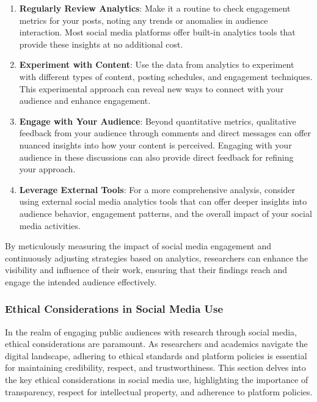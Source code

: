 \documentclass[
]{book}
\begin{document}
\begin{enumerate}
\def\labelenumi{\arabic{enumi}.}
\item
  \textbf{Regularly Review Analytics}: Make it a routine to check engagement metrics for your posts, noting any trends or anomalies in audience interaction. Most social media platforms offer built-in analytics tools that provide these insights at no additional cost.
\item
  \textbf{Experiment with Content}: Use the data from analytics to experiment with different types of content, posting schedules, and engagement techniques. This experimental approach can reveal new ways to connect with your audience and enhance engagement.
\item
  \textbf{Engage with Your Audience}: Beyond quantitative metrics, qualitative feedback from your audience through comments and direct messages can offer nuanced insights into how your content is perceived. Engaging with your audience in these discussions can also provide direct feedback for refining your approach.
\item
  \textbf{Leverage External Tools}: For a more comprehensive analysis, consider using external social media analytics tools that can offer deeper insights into audience behavior, engagement patterns, and the overall impact of your social media activities.
\end{enumerate}

By meticulously measuring the impact of social media engagement and continuously adjusting strategies based on analytics, researchers can enhance the visibility and influence of their work, ensuring that their findings reach and engage the intended audience effectively.

\hypertarget{ethical-considerations-in-social-media-use}{%
\subsubsection*{Ethical Considerations in Social Media Use}\label{ethical-considerations-in-social-media-use}}

In the realm of engaging public audiences with research through social media, ethical considerations are paramount. As researchers and academics navigate the digital landscape, adhering to ethical standards and platform policies is essential for maintaining credibility, respect, and trustworthiness. This section delves into the key ethical considerations in social media use, highlighting the importance of transparency, respect for intellectual property, and adherence to platform policies.
\end{document}
